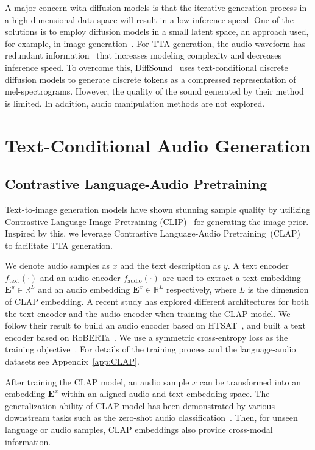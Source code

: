 A major concern with diffusion models is that the iterative generation process in a high-dimensional data space will result in a low inference speed. One of the solutions is to employ diffusion models in a small latent space, an approach used, for example, in image generation~\cite{LSGM, D2C, rombach2022high}. For TTA generation, the audio waveform has redundant information~\cite{liu2022simple, liu2022learning} that increases modeling complexity and decreases inference speed. To overcome this, DiffSound~\cite{yang2022diffsound} uses text-conditional discrete diffusion models to generate discrete tokens as a compressed representation of mel-spectrograms. However, the quality of the sound generated by their method is limited. In addition, audio manipulation methods are not explored. 

\section{Text-Conditional Audio Generation}
\label{AudioLDM}

\subsection{Contrastive Language-Audio Pretraining}
\label{CLAP}
Text-to-image generation models have shown stunning sample quality by utilizing Contrastive Language-Image Pretraining (CLIP)~\cite{CLIP} for generating the image prior. Inspired by this, we leverage Contrastive Language-Audio Pretraining~(CLAP)~\cite{wu2022large} to facilitate TTA generation.   

We denote audio samples as $x$ and the text description as $y$. A text encoder $f_{\text{text}}(\cdot)$ and an audio encoder $f_{\text{audio}}(\cdot)$ are used to extract a text embedding $\boldsymbol{E}^{y}\in \mathbb{R}^{L}$ and an audio embedding $\boldsymbol{E}^{x}\in \mathbb{R}^{L}$ respectively, where $L$ is the dimension of CLAP embedding. A recent study \cite{wu2022large} has explored different architectures for both the text encoder and the audio encoder when training the CLAP model. We follow their result to build an audio encoder based on HTSAT~\cite{HTSAT}, and built a text encoder based on RoBERTa~\cite{RoBERTa}. We use a symmetric cross-entropy loss as the training objective~\cite{CLIP,wu2022large}. For details of the training process and the language-audio datasets see Appendix~\ref{app:CLAP}. 

After training the CLAP model, an audio sample $x$ can be transformed into an embedding $\boldsymbol{E}^{x}$ within an aligned audio and text embedding space. The generalization ability of CLAP model has been demonstrated by various downstream tasks such as the zero-shot audio classification~\cite{wu2022large}. Then, for unseen language or audio samples, CLAP embeddings also provide cross-modal information.

